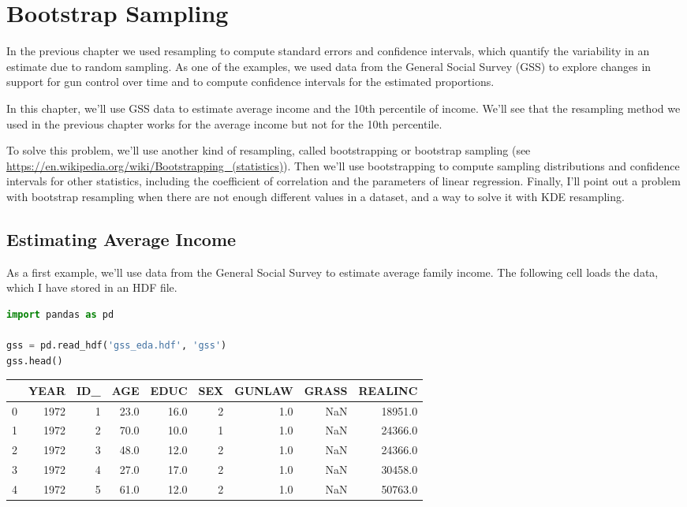 \hypertarget{bootstrap-sampling}{%
\chapter{Bootstrap Sampling}\label{bootstrap-sampling}}

In the previous chapter we used resampling to compute standard errors
and confidence intervals, which quantify the variability in an estimate
due to random sampling. As one of the examples, we used data from the
General Social Survey (GSS) to explore changes in support for gun
control over time and to compute confidence intervals for the estimated
proportions.

In this chapter, we'll use GSS data to estimate average income and the
10th percentile of income. We'll see that the resampling method we used
in the previous chapter works for the average income but not for the
10th percentile.

To solve this problem, we'll use another kind of resampling, called
bootstrapping or bootstrap sampling (see
\url{https://en.wikipedia.org/wiki/Bootstrapping_(statistics)}). Then
we'll use bootstrapping to compute sampling distributions and confidence
intervals for other statistics, including the coefficient of correlation
and the parameters of linear regression. Finally, I'll point out a
problem with bootstrap resampling when there are not enough different
values in a dataset, and a way to solve it with KDE resampling.

\hypertarget{estimating-average-income}{%
\section{Estimating Average Income}\label{estimating-average-income}}

As a first example, we'll use data from the General Social Survey to
estimate average family income. The following cell loads the data, which
I have stored in an HDF file.

\begin{lstlisting}[language=Python,style=source]
import pandas as pd

gss = pd.read_hdf('gss_eda.hdf', 'gss')
gss.head()
\end{lstlisting}

\begin{tabular}{lrrrrrrrr}
\toprule
{} &  YEAR &  ID\_ &   AGE &  EDUC &  SEX &  GUNLAW &  GRASS &  REALINC \\
\midrule
0 &  1972 &    1 &  23.0 &  16.0 &    2 &     1.0 &    NaN &  18951.0 \\
1 &  1972 &    2 &  70.0 &  10.0 &    1 &     1.0 &    NaN &  24366.0 \\
2 &  1972 &    3 &  48.0 &  12.0 &    2 &     1.0 &    NaN &  24366.0 \\
3 &  1972 &    4 &  27.0 &  17.0 &    2 &     1.0 &    NaN &  30458.0 \\
4 &  1972 &    5 &  61.0 &  12.0 &    2 &     1.0 &    NaN &  50763.0 \\
\bottomrule
\end{tabular}

